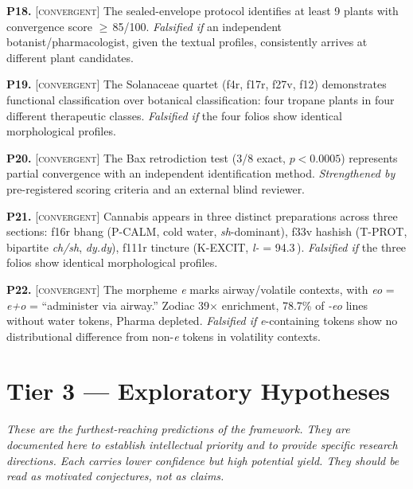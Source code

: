 \documentclass[11pt,a4paper]{article}
\newcommand{\convergent}{\textsc{[convergent]}}
\newcommand{\falsmark}{\textit{Falsified if}}
\begin{document}
\medskip

\noindent\textbf{P18.} \convergent{} The sealed-envelope protocol identifies at least 9 plants with convergence score $\geq$\,85/100. \falsmark{} an independent botanist/pharmacologist, given the textual profiles, consistently arrives at different plant candidates.

\medskip

\noindent\textbf{P19.} \convergent{} The Solanaceae quartet (f4r, f17r, f27v, f12) demonstrates functional classification over botanical classification: four tropane plants in four different therapeutic classes. \falsmark{} the four folios show identical morphological profiles.

\medskip

\noindent\textbf{P20.} \convergent{} The Bax retrodiction test (3/8 exact, $p < 0.0005$) represents partial convergence with an independent identification method. \textit{Strengthened by} pre-registered scoring criteria and an external blind reviewer.

\medskip

\noindent\textbf{P21.} \convergent{} Cannabis appears in three distinct preparations across three sections: f16r bhang (P-CALM, cold water, \textit{sh}-dominant), f33v hashish (T-PROT, bipartite \textit{ch/sh}, \textit{dy.dy}), f111r tincture (K-EXCIT, \textit{l-} = 94.3\,\textperthousand). \falsmark{} the three folios show identical morphological profiles.

\medskip

\noindent\textbf{P22.} \convergent{} The morpheme \textit{e} marks airway/volatile contexts, with \textit{eo} = \textit{e+o} = ``administer via airway.'' Zodiac 39$\times$ enrichment, 78.7\% of \textit{-eo} lines without water tokens, Pharma depleted. \falsmark{} \textit{e}-containing tokens show no distributional difference from non-\textit{e} tokens in volatility contexts.

\section{Tier 3 --- Exploratory Hypotheses}

\textit{These are the furthest-reaching predictions of the framework. They are documented here to establish intellectual priority and to provide specific research directions. Each carries lower confidence but high potential yield. They should be read as motivated conjectures, not as claims.}
\end{document}
